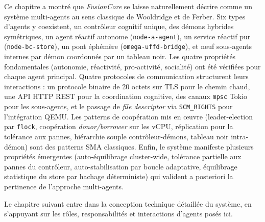 Ce chapitre a montré que \emph{FusionCore} se laisse naturellement décrire comme un système multi-agents au sens classique de Wooldridge et de Ferber. Six types d'agents y coexistent, un contrôleur cognitif unique, des démons hybrides symétriques, un agent réactif autonome (\texttt{node-a-agent}), un service réactif pur (\texttt{node-bc-store}), un pont éphémère (\texttt{omega-uffd-bridge}), et neuf sous-agents internes par démon coordonnés par un tableau noir. Les quatre propriétés fondamentales (autonomie, réactivité, pro-activité, socialité) ont été vérifiées pour chaque agent principal. Quatre protocoles de communication structurent leurs interactions : un protocole binaire de 20 octets sur TLS pour le chemin chaud, une API HTTP REST pour la coordination cognitive, des canaux \texttt{mpsc} Tokio pour les sous-agents, et le passage de \emph{file descriptor} via \texttt{SCM\_RIGHTS} pour l'intégration QEMU. Les patterns de coopération mis en œuvre (leader-election par \texttt{flock}, coopération \emph{donor/borrower} sur les vCPU, réplication pour la tolérance aux pannes, hiérarchie souple contrôleur-démons, tableau noir intra-démon) sont des patterns SMA classiques. Enfin, le système manifeste plusieurs propriétés émergentes (auto-équilibrage cluster-wide, tolérance partielle aux pannes du contrôleur, auto-stabilisation par boucle adaptative, équilibrage statistique du store par hachage déterministe) qui valident a posteriori la pertinence de l'approche multi-agents.

Le chapitre suivant entre dans la conception technique détaillée du système, en s'appuyant sur les rôles, responsabilités et interactions d'agents posés ici.
